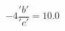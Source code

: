 \documentclass[preview]{standalone}
\begin{document}
\begin{align*}
-4 \dfrac{'b'}{'c'}= 10.0
\end{align*}
\end{document}
